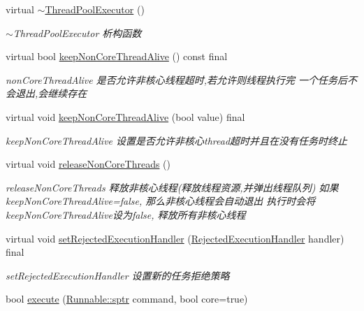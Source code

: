 \begin{DoxyCompactItemize}
\mbox{\label{classThreadPoolExecutor_a1d5a1c3330593f243959256d32068c15}} 
virtual \hyperlink{classThreadPoolExecutor_a1d5a1c3330593f243959256d32068c15}{$\sim$\+Thread\+Pool\+Executor} ()
\begin{DoxyCompactList}\small\item\em $\sim$\+Thread\+Pool\+Executor 析构函数 \end{DoxyCompactList}\item 
virtual bool \hyperlink{classThreadPoolExecutor_ac2aa11f7cde6e6082eb0dde8f2385dce}{keep\+Non\+Core\+Thread\+Alive} () const final
\begin{DoxyCompactList}\small\item\em non\+Core\+Thread\+Alive 是否允许非核心线程超时,若允许则线程执行完 一个任务后不会退出,会继续存在 \end{DoxyCompactList}\item 
virtual void \hyperlink{classThreadPoolExecutor_a7e6ed2d088147377d1e82018ac3dac1d}{keep\+Non\+Core\+Thread\+Alive} (bool value) final
\begin{DoxyCompactList}\small\item\em keep\+Non\+Core\+Thread\+Alive 设置是否允许非核心thread超时并且在没有任务时终止 \end{DoxyCompactList}\item 
\mbox{\label{classThreadPoolExecutor_a280379699ff72325cc4ccaf491e50967}} 
virtual void \hyperlink{classThreadPoolExecutor_a280379699ff72325cc4ccaf491e50967}{release\+Non\+Core\+Threads} ()
\begin{DoxyCompactList}\small\item\em release\+Non\+Core\+Threads 释放非核心线程(释放线程资源,并弹出线程队列) 如果keep\+Non\+Core\+Thread\+Alive=false, 那么非核心线程会自动退出 执行时会将keep\+Non\+Core\+Thread\+Alive设为false, 释放所有非核心线程 \end{DoxyCompactList}\item 
virtual void \hyperlink{classThreadPoolExecutor_a0a471dc0a68b70d99d8215565a4df688}{set\+Rejected\+Execution\+Handler} (\hyperlink{classRejectedExecutionHandler}{Rejected\+Execution\+Handler} handler) final
\begin{DoxyCompactList}\small\item\em set\+Rejected\+Execution\+Handler 设置新的任务拒绝策略 \end{DoxyCompactList}\item 
bool \hyperlink{classThreadPoolExecutor_a4dac3c2435919af5d77aa36069d35bc7}{execute} (\hyperlink{classRunnable_abe8d3066c7305401d6f0aad8e70780f2}{Runnable\+::sptr} command, bool core=true)

\end{DoxyCompactItemize}
